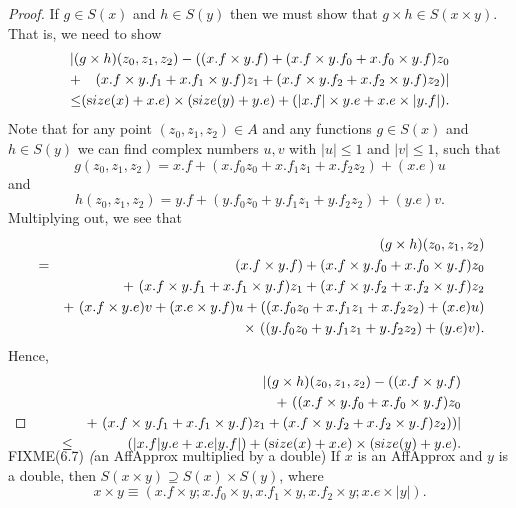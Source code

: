 \begin{proof}{}  If $g \in S(x)$ and $h \in S(y)$ then we must show that $g\times h \in S(x \times y).$  That is, we need to show
\begin{eqnarray*}
&&\hskip-.25in |(g \times h)(z_0,z_1,z_2)   - 
((x.f \times y.f) + 
(x.f \times y.f_0 + x.f_0 \times y.f) z_0 \\
&\hskip-8pt+\hskip-8pt& (x.f \times y.f_1 + x.f_1 \times y.f) z_1 + (x.f \times y.f_2 + x.f_2 \times y.f) z_2)| 
\\
\le&\hskip-8pt\hskip-8pt&\hskip-16pt ({\textrm size}(x) + x.e) \times ({\textrm size}(y) + y.e) + (|x.f| \times y.e + x.e \times |y.f|).
\end{eqnarray*}
Note that for any point $(z_0, z_1, z_2) \in A$ and any functions $g \in S(x)$ and $h \in S(y)$ we can find complex numbers $u, v$ with
$|u| \le 1$ and $|v| \le 1$, such that
$$ g(z_0, z_1, z_2) = x.f + (x.f_0 z_0 + x.f_1 z_1 + x.f_2 z_2) + (x.e) u$$ and 
$$ h(z_0, z_1, z_2) = y.f + (y.f_0 z_0 + y.f_1 z_1 + y.f_2 z_2) + (y.e) v.$$
Multiplying out, we see that 
\begin{eqnarray*}
&&\hskip-36pt(g \times h) (z_0, z_1, z_2)\\
& = &
(x.f \times y.f) + 
(x.f \times y.f_0 + x.f_0 \times y.f) z_0\\
&& +\ (x.f \times y.f_1 + x.f_1 \times y.f) z_1 +
(x.f \times y.f_2 + x.f_2 \times y.f) z_2\\&& + \
(x.f \times y.e) v + (x.e \times y.f) u + 
((x.f_0 z_0 + x.f_1 z_1 + x.f_2 z_2) + (x.e) u)\\
&& \times\
((y.f_0 z_0 + y.f_1 z_1 + y.f_2 z_2) + (y.e) v).
                                              \end{eqnarray*}
Hence,
\begin{eqnarray*}
&&\hskip-48pt |(g \times h) (z_0, z_1, z_2) - ((x.f \times y.f) \\
& & + \
((x.f \times y.f_0 + x.f_0 \times y.f) z_0\\
&& +\ (x.f \times y.f_1 + x.f_1 \times y.f) z_1 +
(x.f \times y.f_2 + x.f_2 \times y.f) z_2))|
 \\
&\le& (|x.f| y.e + x.e |y.f|) + 
({\textrm size}(x) + x.e) \times ({\textrm size}(y) + y.e).\\
\noalign{\vskip-36pt}
\end{eqnarray*}
\end{proof}

\begin{proposition}{FIXME(6.7) {\textit (an AffApprox multiplied by a double)}}
If $x$ is an {\textrm AffApprox}  and $y$ is a double{\textrm ,} then $S(x \times y) \supseteq S(x) \times S(y)${\textrm ,} where
$$ x \times y \equiv (x.f \times y;  x.f_0 \times y, 
x.f_1 \times y,  x.f_2 \times y; 
x.e \times |y|). $$
\end{proposition}

